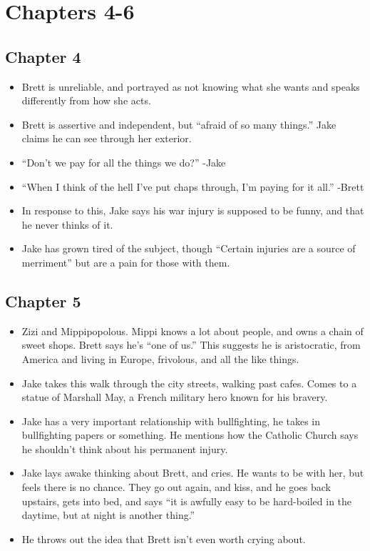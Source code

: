 \documentclass[11pt]{article}
\begin{document}
\section{Chapters 4-6}
\subsection{Chapter 4}
\begin{itemize}
	\item Brett is unreliable, and portrayed as not knowing what she wants and 
		speaks differently from how she acts.  
	\item Brett is assertive and independent, but ``afraid of so many 
		things.''  Jake claims he can see through her exterior.
	\item ``Don't we pay for all the things we do?'' -Jake
	\item ``When I think of the hell I've put chaps through, I'm paying for it 
		all.''  -Brett
	\item In response to this, Jake says his war injury is supposed to be 
		funny, and that he never thinks of it.
	\item Jake has grown tired of the subject, though ``Certain injuries are a 
		source of merriment'' but are a pain for those with them.
\end{itemize}
\subsection{Chapter 5}
\begin{itemize}
	\item Zizi and Mippipopolous.  Mippi knows a lot about people, and owns a 
		chain of sweet shops.  Brett says he's ``one of us.'' This suggests he 
		is aristocratic, from America and living in Europe, frivolous, and all 
		the like things.
	\item Jake takes this walk through the city streets, walking past cafes.  
		Comes to a statue of Marshall May, a French military hero known for
		his bravery.
	\item Jake has a very important relationship with bullfighting, he takes 
		in bullfighting papers or something.  He mentions how the Catholic 
		Church says he shouldn't think about his permanent injury.
	\item Jake lays awake thinking about Brett, and cries.  He wants to be 
		with her, but feels there is no chance.  They go out again, and kiss, 
		and he goes back upstairs, gets into bed, and says ``it is awfully 
		easy to be hard-boiled in the daytime, but at night is another thing.''
	\item He throws out the idea that Brett isn't even worth crying about.
\end{itemize}
\end{document}

